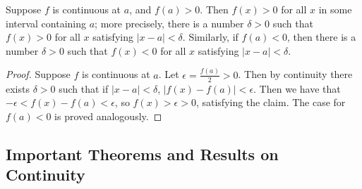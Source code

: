\begin{thm}
    Suppose $f$ is continuous at $a$, and $f(a) > 0$. Then $f(x) > 0$ for all $x$ in some interval containing $a$; more precisely, there is a number $\delta > 0$ such that $f(x) > 0$ for all $x$ satisfying $|x-a| < \delta$. Similarly, if $f(a) < 0$, then there is a number $\delta > 0$ such that $f(x) < 0$ for all $x$ satisfying $|x-a| < \delta$.
\end{thm}
\begin{proof}
    Suppose $f$ is continuous at $a$. Let $\epsilon = \frac{f(a)}{2} > 0$. Then by continuity there exists $\delta > 0$ such that if $|x-a| < \delta$, $|f(x) - f(a)| < \epsilon$. Then we have that $-\epsilon < f(x) - f(a) < \epsilon$, so $f(x) > \epsilon > 0$, satisfying the claim. The case for $f(a) < 0$ is proved analogously.
\end{proof}


\subsection{Important Theorems and Results on Continuity}


